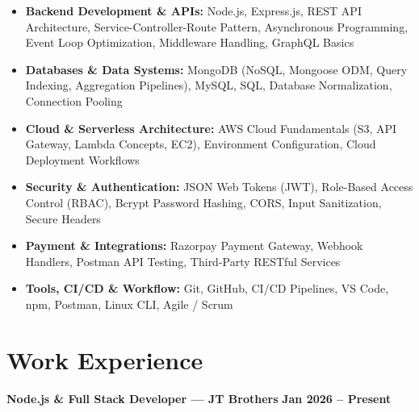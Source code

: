 \documentclass[a4paper,10pt]{article}
\begin{document}
\begin{itemize}

    \item \textbf{Backend Development \& APIs:}
    Node.js, Express.js, REST API Architecture, Service-Controller-Route Pattern,
    Asynchronous Programming, Event Loop Optimization, Middleware Handling, GraphQL Basics

    \item \textbf{Databases \& Data Systems:}
    MongoDB (NoSQL, Mongoose ODM, Query Indexing, Aggregation Pipelines),
    MySQL, SQL, Database Normalization, Connection Pooling

    \item \textbf{Cloud \& Serverless Architecture:}
    AWS Cloud Fundamentals (S3, API Gateway, Lambda Concepts, EC2),
    Environment Configuration, Cloud Deployment Workflows

    \item \textbf{Security \& Authentication:}
    JSON Web Tokens (JWT), Role-Based Access Control (RBAC),
    Bcrypt Password Hashing, CORS, Input Sanitization, Secure Headers

    \item \textbf{Payment \& Integrations:}
    Razorpay Payment Gateway, Webhook Handlers, Postman API Testing,
    Third-Party RESTful Services

    \item \textbf{Tools, CI/CD \& Workflow:}
    Git, GitHub, CI/CD Pipelines, VS Code, npm, Postman, Linux CLI, Agile / Scrum

\end{itemize}

\section*{Work Experience}

\textbf{Node.js \& Full Stack Developer --- JT Brothers}
\hfill
\textbf{Jan 2026 -- Present}
\end{document}
